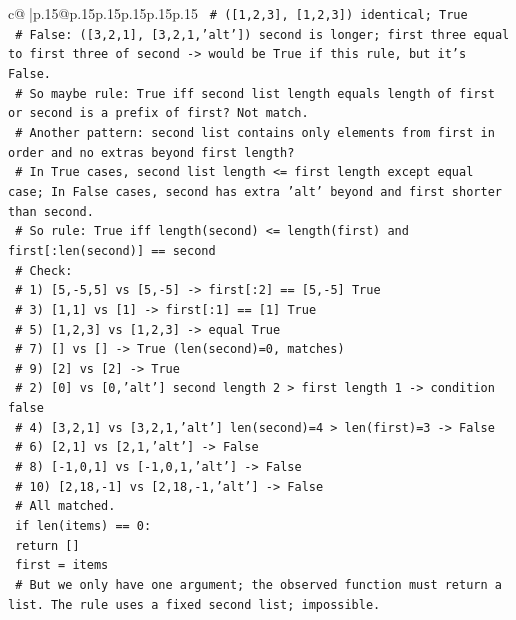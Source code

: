 \documentclass{article}
\begin{document}
{\begin{supertabular}{c@{$\;$}|p{.15\linewidth}@{}p{.15\linewidth}p{.15\linewidth}p{.15\linewidth}p{.15\linewidth}p{.15\linewidth}}
{{{\texttt{    \# ({[}1,2,3{]}, {[}1,2,3{]}) identical; True} \\
\texttt{    \# False: ({[}3,2,1{]}, {[}3,2,1,'alt'{]}) second is longer; first three equal to first three of second {-}> would be True if this rule, but it's False.} \\
\texttt{    \# So maybe rule: True iff second list length equals length of first or second is a prefix of first? Not match.} \\
\texttt{    \# Another pattern: second list contains only elements from first in order and no extras beyond first length? } \\
\texttt{    \# In True cases, second list length <= first length except equal case; In False cases, second has extra 'alt' beyond and first shorter than second.} \\
\texttt{    \# So rule: True iff length(second) <= length(first) and first{[}:len(second){]} == second} \\
\texttt{    \# Check:} \\
\texttt{    \# 1) {[}5,{-}5,5{]} vs {[}5,{-}5{]} {-}> first{[}:2{]} == {[}5,{-}5{]} True} \\
\texttt{    \# 3) {[}1,1{]} vs {[}1{]} {-}> first{[}:1{]} == {[}1{]} True} \\
\texttt{    \# 5) {[}1,2,3{]} vs {[}1,2,3{]} {-}> equal True} \\
\texttt{    \# 7) {[}{]} vs {[}{]} {-}> True (len(second)=0, matches)} \\
\texttt{    \# 9) {[}2{]} vs {[}2{]} {-}> True} \\
\texttt{    \# 2) {[}0{]} vs {[}0,'alt'{]} second length 2 > first length 1 {-}> condition false} \\
\texttt{    \# 4) {[}3,2,1{]} vs {[}3,2,1,'alt'{]} len(second)=4 > len(first)=3 {-}> False} \\
\texttt{    \# 6) {[}2,1{]} vs {[}2,1,'alt'{]} {-}> False} \\
\texttt{    \# 8) {[}{-}1,0,1{]} vs {[}{-}1,0,1,'alt'{]} {-}> False} \\
\texttt{    \# 10) {[}2,18,{-}1{]} vs {[}2,18,{-}1,'alt'{]} {-}> False} \\
\texttt{    \# All matched.} \\
\texttt{    if len(items) == 0:} \\
\texttt{        return {[}{]}} \\
\texttt{    first = items} \\
\texttt{    \# But we only have one argument; the observed function must return a list. The rule uses a fixed second list; impossible.} \\
}}}
\end{supertabular}}
\end{document}
